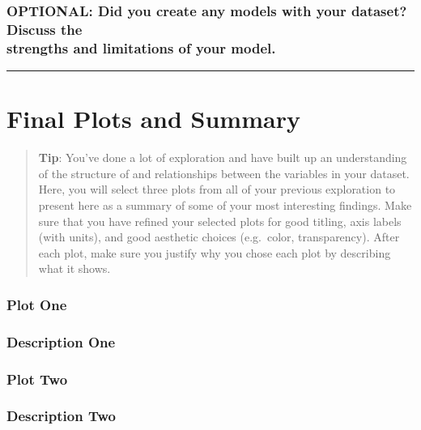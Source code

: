 \documentclass[]{article}
\begin{document}
\subsubsection{\texorpdfstring{OPTIONAL: Did you create any models with
your dataset? Discuss the\\
strengths and limitations of your
model.}{OPTIONAL: Did you create any models with your dataset? Discuss the strengths and limitations of your model.}}\label{optional-did-you-create-any-models-with-your-dataset-discuss-the-strengths-and-limitations-of-your-model.}

\begin{center}\rule{0.5\linewidth}{\linethickness}\end{center}

\section{Final Plots and Summary}\label{final-plots-and-summary}

\begin{quote}
\textbf{Tip}: You've done a lot of exploration and have built up an
understanding of the structure of and relationships between the
variables in your dataset. Here, you will select three plots from all of
your previous exploration to present here as a summary of some of your
most interesting findings. Make sure that you have refined your selected
plots for good titling, axis labels (with units), and good aesthetic
choices (e.g.~color, transparency). After each plot, make sure you
justify why you chose each plot by describing what it shows.
\end{quote}

\subsubsection{Plot One}\label{plot-one}

\subsubsection{Description One}\label{description-one}

\subsubsection{Plot Two}\label{plot-two}

\subsubsection{Description Two}\label{description-two}
\end{document}
